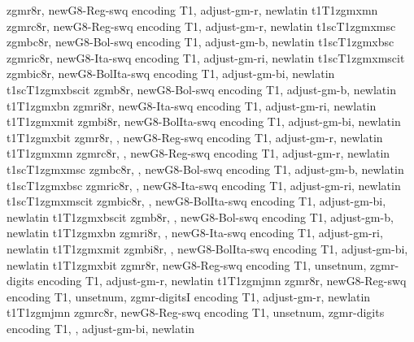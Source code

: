 %
{zgmr8r,%
newG8-Reg-swq encoding T1,%
adjust-gm-r,%
newlatin}
{t1}{T1}{zgmx}{m}{n}{}
%
{zgmrc8r,%
newG8-Reg-swq encoding T1,%
adjust-gm-r,%
newlatin}
{t1sc}{T1}{zgmx}{m}{sc}{}
%
{zgmbc8r,%
newG8-Bol-swq encoding T1,%
adjust-gm-b,%
newlatin}
{t1sc}{T1}{zgmx}{b}{sc}{}
%
{zgmric8r,%
newG8-Ita-swq encoding T1,%
adjust-gm-ri,%
newlatin}
{t1sc}{T1}{zgmx}{m}{scit}{}
%
{zgmbic8r,%
newG8-BolIta-swq encoding T1,%
adjust-gm-bi,%
newlatin}
{t1sc}{T1}{zgmx}{b}{scit}{}
%
{zgmb8r,%
newG8-Bol-swq encoding T1,%
adjust-gm-b,%
newlatin}
{t1}{T1}{zgmx}{b}{n}{}
%
{zgmri8r,%
newG8-Ita-swq encoding T1,%
adjust-gm-ri,%
newlatin}
{t1}{T1}{zgmx}{m}{it}{}
%
{zgmbi8r,%
newG8-BolIta-swq encoding T1,%
adjust-gm-bi,%
newlatin}
{t1}{T1}{zgmx}{b}{it}{}
%
{zgmr8r,%
\metrics {},%
newG8-Reg-swq encoding T1,%
adjust-gm-r,%
newlatin}
{t1}{T1}{zgmx}{m}{n}{}
%
{zgmrc8r,%
\metrics {},%
newG8-Reg-swq encoding T1,%
adjust-gm-r,%
newlatin}
{t1sc}{T1}{zgmx}{m}{sc}{}
%
{zgmbc8r,%
\metrics {},%
newG8-Bol-swq encoding T1,%
adjust-gm-b,%
newlatin}
{t1sc}{T1}{zgmx}{b}{sc}{}
%
{zgmric8r,%
\metrics {},%
newG8-Ita-swq encoding T1,%
adjust-gm-ri,%
newlatin}
{t1sc}{T1}{zgmx}{m}{scit}{}
%
{zgmbic8r,%
\metrics {},%
newG8-BolIta-swq encoding T1,%
adjust-gm-bi,%
newlatin}
{t1}{T1}{zgmx}{b}{scit}{}
%
{zgmb8r,%
\metrics {},%
newG8-Bol-swq encoding T1,%
adjust-gm-b,%
newlatin}
{t1}{T1}{zgmx}{b}{n}{}
%
{zgmri8r,%
\metrics {},%
newG8-Ita-swq encoding T1,%
adjust-gm-ri,%
newlatin}
{t1}{T1}{zgmx}{m}{it}{}
%
{zgmbi8r,%
\metrics {},%
newG8-BolIta-swq encoding T1,%
adjust-gm-bi,%
newlatin}
{t1}{T1}{zgmx}{b}{it}{}
%
{zgmr8r,%
newG8-Reg-swq encoding T1,%
unsetnum,%
zgmr-digits encoding T1,%
adjust-gm-r,%
newlatin}
{t1}{T1}{zgmj}{m}{n}{}
%
{zgmr8r,%
newG8-Reg-swq encoding T1,%
unsetnum,%
zgmr-digitsI encoding T1,%
adjust-gm-r,%
newlatin}
{t1}{T1}{zgmj}{m}{n}{}
%
{zgmrc8r,%
newG8-Reg-swq encoding T1,%
unsetnum,%
zgmr-digits encoding T1,%
\metrics {}  ,%
adjust-gm-bi,%
newlatin}

